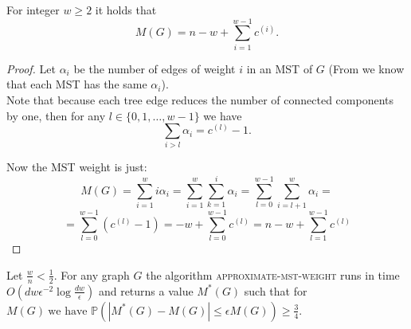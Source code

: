 \begin{theorem}
    For integer $w \geq 2$ it holds that
    \begin{equation}
    M(G) = n - w + \sum\limits_{i=1}^{w-1}c^{(i)}.
    \end{equation}
\end{theorem}
\begin{proof}
    Let $\alpha_i$ be the number of edges of weight $i$ in an MST of $G$ (From  we know that each MST has the same $\alpha_i$). \\
    Note that because each tree edge reduces the number of connected components by one, then for any $l \in \{0, 1,\ldots, w - 1\}$ we have 
    \begin{equation}
    \sum\limits_{i>l} \alpha_i = c^{(l)} - 1.
    \end{equation}
    
    Now the MST weight is just:
    \begin{equation*}
      M(G) = \sum\limits_{i = 1}^{w} i\alpha_i = \sum\limits_{i = 1}^{w}\sum\limits_{k=1}^i \alpha_i = \sum\limits_{l = 0}^{w - 1}\sum\limits_{i = l + 1}^{w} \alpha_i = 
    \end{equation*}
    \begin{equation*}
           = \sum\limits_{l = 0}^{w - 1} (c^{(l)} - 1) = - w +  \sum\limits_{l = 0}^{w - 1} c^{(l)} =  n - w +  \sum\limits_{l = 1}^{w - 1} c^{(l)} 
    \end{equation*}
\end{proof}
\begin{theorem}
        Let $\frac{w}n < \frac12$. For any graph $G$ the algorithm \textsc{approximate-mst-weight} runs in time $O(dw\epsilon^{-2}\log{\frac{dw}\epsilon})$ and returns a value $M^*(G)$ such that for $M(G)\ \text{we have }\mathbb{P}(|M^*(G) - M(G)| \leq \epsilon M(G)) \geq \frac34$.
\end{theorem}
